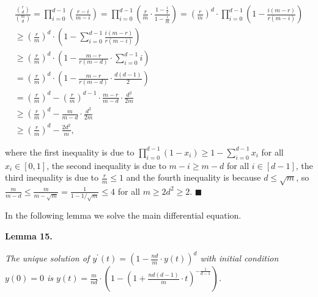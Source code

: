 \documentclass[10pt,a4paper]{article}
\begin{document}
\[\begin{gathered}
\displaystyle\frac{\binom{r}{d}}{\binom{m}{d}}=\prod_{i=0}^{d-1}\left(\frac{r-i}{m-i}\right)=\prod_{i=0}^{d-1}\left(\frac{r}{m}\cdot\frac{1-\frac{i}{r}}{1-\frac{i}{m}}\right) \displaystyle=\left(\frac{r}{m}\right)^{d}\cdot\prod_{i=0}^{d-1}\left(1-\frac{i(m-r)}{r(m-i)}\right) \\
\displaystyle\geq\left(\frac{r}{m}\right)^{d}\cdot\left(1-\sum_{i=0}^{d-1}\frac{i(m-r)}{r(m-i)}\right) \\
\displaystyle\geq\left(\frac{r}{m}\right)^{d}\cdot\left(1-\frac{m-r}{r(m-d)}\cdot\sum_{i=0}^{d-1}i\right) \\
\displaystyle=\left(\frac{r}{m}\right)^{d}\cdot\left(1-\frac{m-r}{r(m-d)}\cdot\frac{d(d-1)}{2}\right) \\
\displaystyle=\left(\frac{r}{m}\right)^{d}-\left(\frac{r}{m}\right)^{d-1}\cdot\frac{m-r}{m-d}\cdot\frac{d^{2}}{2m} \\
\displaystyle\geq\left(\frac{r}{m}\right)^{d}-\frac{m}{m-d}\cdot\frac{d^{2}}{2m} \\
\displaystyle\geq\left(\frac{r}{m}\right)^{d}-\frac{2d^{2}}{m},
\end{gathered}\]


where the first inequality is due to $\prod_{i=0}^{d-1}(1-x_{i})\geq 1-\sum_{i=0}^{d-1}x_{i}$ for all $x_{i}\in[0,1]$, the second inequality is due to $m-i\geq m-d$ for all $i\in[d-1]$, the third inequality is due to $\frac{r}{m}\leq 1$ and the fourth inequality is because $d\leq\sqrt{m}$, so $\frac{m}{m-d}\leq\frac{m}{m-\sqrt{m}}=\frac{1}{1-1/\sqrt{m}}\leq 4$ for all $m\geq 2d^{2}\geq 2$.
\ensuremath{\blacksquare}\par





In the following lemma we solve the main differential equation.\par





\par\medskip\noindent\textbf{\textbf{Lemma 15}\textbf{.}}\par



\emph{The unique solution of $y^{\prime}(t)=\left(1-\frac{nd}{m}\cdot y(t)\right)^{d}$ with initial condition $y(0)=0$ is
$y(t)=\frac{m}{nd}\cdot\left(1-\left(1+\frac{nd(d-1)}{m}\cdot t\right)^{-\frac{1}{d-1}}\right)$.}\par
\end{document}

